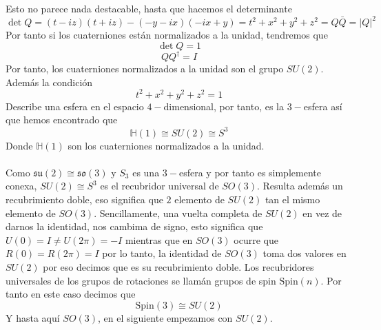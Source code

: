 \documentclass[12pt]{article}
\begin{document}
Esto no parece nada destacable, hasta que hacemos el determinante 
\begin{equation}
    \det Q =(t-iz)(t+iz)-(-y-ix)(-ix+y) =t^2+x^2+y^2+z^2 =Q\bar Q =|Q|^2
\end{equation}
Por tanto si los cuaterniones están normalizados a la unidad, tendremos que 
$$\det Q =1$$
$$  QQ^\dagger= I$$
Por tanto, los cuaterniones normalizados a la unidad son el grupo $SU(2)$. Además la condición 
$$t^2+x^2+y^2+z^2=1$$
Describe una esfera en el espacio $4-$dimensional, por tanto, es la $3-$esfera así que hemos encontrado que
\begin{equation}
    \mathbb{H}(1)\cong SU(2)\cong S^3
\end{equation}
Donde $\mathbb{H}(1)$ son los cuaterniones  normalizados a la unidad. \\\\
Como $    \mathfrak{s}\mathfrak{u}(2) \cong \mathfrak{s}\mathfrak{o}(3)$ y $S_3$ es una $3-$esfera y por tanto es simplemente conexa, $SU(2)\cong S^3$ es el recubridor universal de $SO(3)$. Resulta además un recubrimiento doble, eso significa que $2$ elemento de $SU(2)$ tan el mismo elemento de $SO(3)$. Sencillamente, una vuelta completa de $SU(2)$ en vez de darnos la identidad, nos cambima de signo, esto significa que $U(0)=I\neq U(2\pi)=-I$ mientras que en $SO(3)$ ocurre que $R(0)=R(2\pi)=I$ por lo tanto, la identidad de $SO(3)$ toma dos valores en $SU(2)$ por eso decimos que es su recubrimiento doble. Los recubridores universales de los grupos de rotaciones se llamán grupos de spin $\text{Spin}(n)$. Por tanto en este caso decimos que
$$\text{Spin}(3)\cong SU(2)$$
Y hasta aquí $SO(3)$, en el siguiente empezamos con $SU(2)$.
\end{document}
